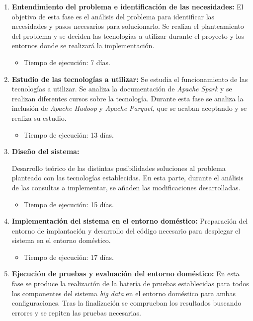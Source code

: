 \begin{enumerate}
\item \textbf{Entendimiento del problema e identificación de las necesidades:}
El objetivo de esta fase es el análisis del problema para identificar las necesidades y pasos necesarios para solucionarlo. Se realiza el planteamiento del problema y se deciden las tecnologías a utilizar durante el proyecto y los entornos donde se realizará la implementación.

\begin{itemize}
\item Tiempo de ejecución: 7 días.
\end{itemize}

\clearpage
\item \textbf{Estudio de las tecnologías a utilizar:}
Se estudia el funcionamiento de las tecnologías a utilizar. Se analiza la documentación de \textit{Apache Spark} y se realizan diferentes cursos sobre la tecnología. Durante esta fase se analiza la inclusión de \textit{Apache Hadoop} y \textit{Apache Parquet}, que se acaban aceptando y se realiza su estudio.

\begin{itemize}
\item Tiempo de ejecución: 13 días.
\end{itemize}

\item \textbf{Diseño del sistema:}

Desarrollo teórico de las distintas posibilidades soluciones al problema planteado con las tecnologías establecidas. En esta parte, durante el análisis de las consultas a implementar, se añaden las modificaciones desarrolladas.

\begin{itemize}
\item Tiempo de ejecución: 15 días.
\end{itemize}

\item \textbf{Implementación del sistema en el entorno doméstico:}
Preparación del entorno de implantación y desarrollo del código necesario para desplegar el sistema en el entorno doméstico.
 
\begin{itemize}
\item Tiempo de ejecución: 17 días.
\end{itemize}

\item \textbf{Ejecución de pruebas y evaluación del entorno doméstico:}
En esta fase se produce la realización de la batería de pruebas establecidas para todos los componentes del sistema \textit{big data} en el entorno doméstico para ambas configuraciones. Tras la finalización se comprueban los resultados buscando errores y se repiten las pruebas necesarias.


\end{enumerate}
